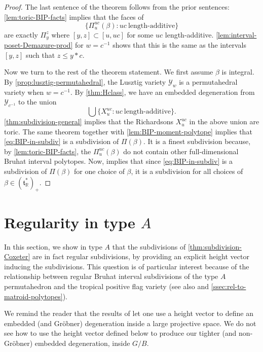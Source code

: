 \documentclass[11pt]{amsart}
\theoremstyle{definition}
\newcommand{\RR}{\mathbb{R}}
\def\pt{\beta}
\def\BB{{(\lie{t}_\RR^*)_+}}
\newcommand\lie[1]{{\mathfrak #1}}
\newcommand\calY{{\mathcal Y}}
\begin{document}
\begin{proof}
  The last sentence of the theorem follows from the prior sentences:
  \cref{lem:toric-BIP-facts} implies that the faces of
  \[ \{\Pi_u^{uc}(\pt): uc~\text{length-additive}\} \]
  are exactly $\Pi_y^z$ where $[y,z] \subset [u,uc]$ for some $uc$
  length-additive. \cref{lem:interval-poset-Demazure-prod} for
  $w = c^{-1}$ shows that this is the same as the intervals $[y,z]$
  such that $z \leq y *c$.
	
	Now we turn to the rest of the theorem statement. We first assume $\pt$ is integral. By \cref{prop:lusztig-permutahedral}, the Lusztig variety $\calY_w$ is a permutahedral variety when $w=c^{-1}$. By \cref{thm:Hclass}, we have an embedded degeneration from $\calY_{c^{-1}}$ to the union
	\[\bigcup\{X_u^{uc}: uc~\text{length-additive}\}.\]
	 \cref{thm:subdivision-general} implies that the Richardsons $X_u^{uc}$ in the above union are toric. The same theorem together with \cref{lem:BIP-moment-polytope} implies that \eqref{eq:BIP-in-subdiv}
	is a subdivision of $\Pi(\pt)$. It is a finest subdivision because, by \cref{lem:toric-BIP-facts}, the $\Pi_u^{uc}(\pt)$ do not contain other full-dimensional Bruhat interval polytopes. Now, \cite[Theorem 7.6]{BDLSB} implies that since \eqref{eq:BIP-in-subdiv} is a subdivision of $\Pi(\pt)$ for one choice of $\pt$, it is a subdivision for all choices of $\pt \in \BB$.
\end{proof}


\section{Regularity in type $A$} \label{sec:regularity-type-A}

In this section, we show in type $A$ that the subdivisions of
\cref{thm:subdivision-Coxeter} are in fact regular subdivisions, by
providing an explicit height vector inducing the subdivisions. This
question is of particular interest because of the relationship between
regular Bruhat interval subdivisions of the type $A$ permutahedron and
the tropical positive flag variety \cite{B23,JLLO23} (see also
\cite{BEW24} and \cref{ssec:rel-to-matroid-polytopes}).

We remind the reader that the results of
\cite{sturmfels1991grobner,zhu2012degenerations} let one use a height
vector to define an embedded (and Gr\"obner) degeneration inside a
large projective space. We do not see how to use the height vector defined
below to produce our tighter (and non-Gr\"obner) embedded
degeneration, inside $G/B$.
\end{document}
